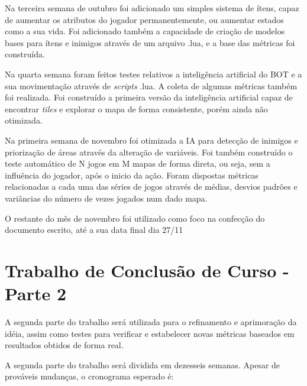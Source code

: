 Na terceira semana de outubro foi adicionado um simples sistema de ítens, capaz de aumentar os atributos do jogador permanentemente, ou aumentar estados como a sua vida. Foi adicionado também a capacidade de criação de modelos bases para ítens e inimigos através de um arquivo .lua, e a base das métricas foi construída. 

Na quarta semana foram feitos testes relativos a inteligência artificial do BOT e a sua movimentação através de \textit{scripts} .lua. A coleta de algumas métricas também foi realizada. Foi construído a primeira versão da inteligência artificial capaz de encontrar \textit{tiles} e explorar o mapa de forma consistente, porém ainda não otimizada. 

Na primeira semana de novembro foi otimizada a IA para detecção de inimigos e priorização de áreas através da alteração de variáveis. Foi também construído o teste automático de N jogos em M mapas de forma direta, ou seja, sem a influência do jogador, após o inicio da ação. Foram dispostas métricas relacionadas a cada uma das séries de jogos através de médias, desvios padrões e variâncias do número de vezes jogados num dado mapa. 

O restante do mês de novembro foi utilizado como foco na confecção do documento escrito, até a sua data final dia 27/11


\section{Trabalho de Conclusão de Curso - Parte 2}

A segunda parte do trabalho será utilizada para o refinamento e aprimoração da idéia, assim como testes para verificar e estabelecer novas métricas baseados em resultados obtidos de forma real. 

A segunda parte do trabalho será dividida em dezesseis semanas. Apesar de prováveis mudanças, o cronograma esperado é:

